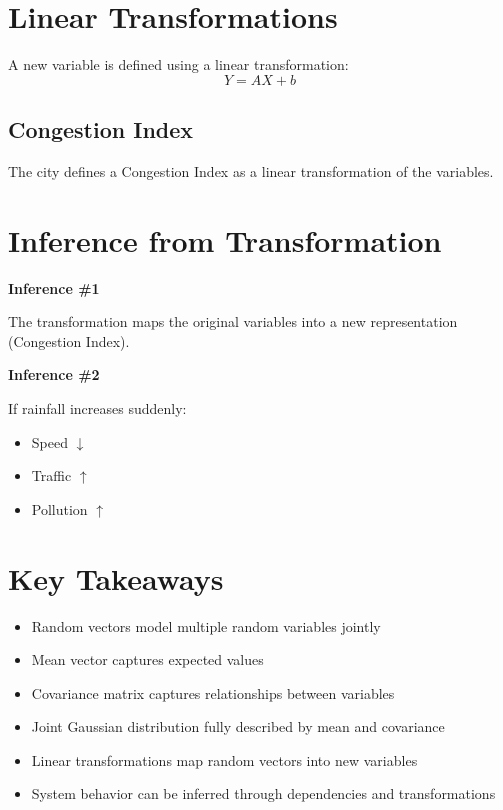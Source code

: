 \documentclass[11pt]{article}
\begin{document}
\section{Linear Transformations}

A new variable is defined using a linear transformation:
\[
Y = AX + b
\]

\subsection*{Congestion Index}

The city defines a Congestion Index as a linear transformation of the variables.

\section{Inference from Transformation}

\textbf{Inference \#1}

The transformation maps the original variables into a new representation (Congestion Index).

\textbf{Inference \#2}

If rainfall increases suddenly:
\begin{itemize}
    \item Speed $\downarrow$
    \item Traffic $\uparrow$
    \item Pollution $\uparrow$
\end{itemize}

\section{Key Takeaways}

\begin{itemize}
    \item Random vectors model multiple random variables jointly
    \item Mean vector captures expected values
    \item Covariance matrix captures relationships between variables
    \item Joint Gaussian distribution fully described by mean and covariance
    \item Linear transformations map random vectors into new variables
    \item System behavior can be inferred through dependencies and transformations
\end{itemize}
\end{document}

